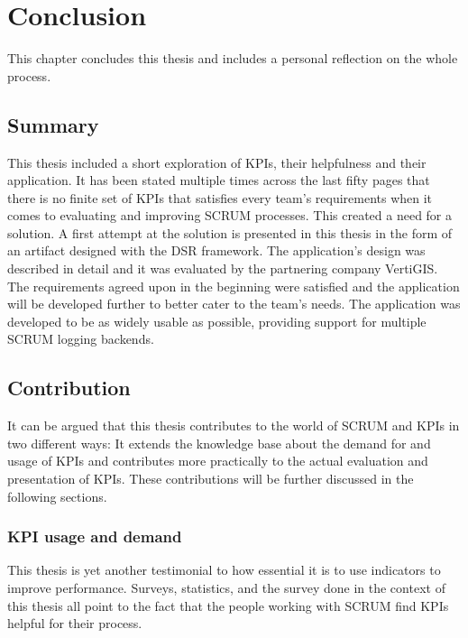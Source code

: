 
\chapter{Conclusion} 
\label{Chapter7} 

This chapter concludes this thesis and includes a personal reflection on the whole process.

\section{Summary}

This thesis included a short exploration of KPIs, their helpfulness and their application.
It has been stated multiple times across the last fifty pages that there is no finite
set of KPIs that satisfies every team's requirements when it comes to evaluating and improving SCRUM processes.
This created a need for a solution.
A first attempt at the solution is presented in this thesis in the form of an artifact designed with the DSR framework.
The application's design was described in detail and it was evaluated by the partnering company VertiGIS.
The requirements agreed upon in the beginning were satisfied and the application will be developed further to better cater to the team's needs.
The application was developed to be as widely usable as possible, providing support for multiple SCRUM logging backends.


\section{Contribution}

It can be argued that this thesis contributes to the world of SCRUM and KPIs in two different ways: 
It extends the knowledge base about the demand for and usage of KPIs and contributes more practically to the actual evaluation and presentation of KPIs. 
These contributions will be further discussed in the following sections. 

\subsection{KPI usage and demand}

This thesis is yet another testimonial to how essential it is to use indicators to improve performance. 
Surveys, statistics, and the survey done in the context of this thesis all point to the fact that the people working with SCRUM find KPIs helpful for their process. 


